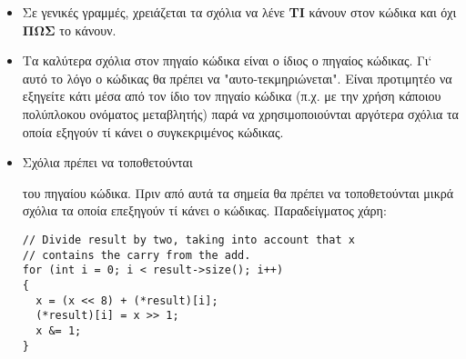 \begin{itemize}

\item Σε γενικές γραμμές, χρειάζεται τα σχόλια να λένε \textbf{ΤΙ} κάνουν στον κώδικα και όχι \textbf{ΠΩΣ} το κάνουν.
\item Τα καλύτερα σχόλια στον πηγαίο κώδικα είναι ο ίδιος ο πηγαίος κώδικας. Γι` αυτό το λόγο ο κώδικας θα πρέπει να "αυτο-τεκμηριώνεται". Είναι προτιμητέο να εξηγείτε κάτι μέσα από τον ίδιο τον πηγαίο κώδικα (π.χ. με την χρήση κάποιου πολύπλοκου ονόματος μεταβλητής) παρά να χρησιμοποιούνται αργότερα σχόλια τα οποία εξηγούν τί κάνει ο συγκεκριμένος κώδικας.%
\item Σχόλια πρέπει να τοποθετούνται 
του πηγαίου κώδικα. Πριν από αυτά τα σημεία θα πρέπει να τοποθετούνται μικρά σχόλια τα οποία επεξηγούν τί κάνει ο κώδικας. Παραδείγματος χάρη: 

\begin{lstlisting}[style=cpp]
// Divide result by two, taking into account that x
// contains the carry from the add.
for (int i = 0; i < result->size(); i++) 
{
  x = (x << 8) + (*result)[i];
  (*result)[i] = x >> 1;
  x &= 1;
}
\end{lstlisting}


\end{itemize}

